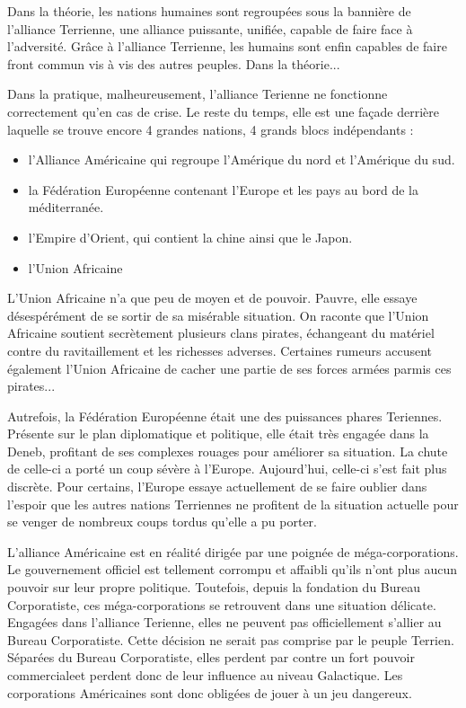 \begin{multicols}{2}
Dans la théorie, les nations humaines sont regroupées sous la bannière de l'alliance Terrienne, une alliance puissante, unifiée, capable de faire face à l'adversité. Grâce à l'alliance Terrienne, les humains sont enfin capables de faire front commun vis à vis des autres peuples. Dans la théorie...

Dans la pratique, malheureusement, l'alliance Terienne ne fonctionne correctement qu'en cas de crise. Le reste du temps, elle est une façade derrière laquelle se trouve encore 4 grandes nations, 4 grands blocs indépendants :
\begin{itemize}
	\item l'Alliance Américaine qui regroupe l'Amérique du nord et l'Amérique du sud.
	\item la Fédération Européenne contenant l'Europe et les pays au bord de la méditerranée. 
	\item l'Empire d'Orient, qui contient la chine ainsi que le Japon.
	\item l'Union Africaine
\end{itemize}

L'Union Africaine n'a que peu de moyen et de pouvoir. Pauvre, elle essaye désespérément de se sortir de sa misérable situation. On raconte que l'Union Africaine soutient secrètement plusieurs clans pirates, échangeant du matériel contre du ravitaillement et les richesses adverses. Certaines rumeurs accusent également l'Union Africaine de cacher une partie de ses forces armées parmis ces pirates... 

Autrefois, la Fédération Européenne était une des puissances phares Teriennes. Présente sur le plan diplomatique et politique, elle était très engagée dans la Deneb, profitant de ses complexes rouages pour améliorer sa situation. La chute de celle-ci a porté un coup sévère à l'Europe. Aujourd'hui, celle-ci s'est fait plus discrète. Pour certains, l'Europe essaye actuellement de se faire oublier dans l'espoir que les autres nations Terriennes ne profitent de la situation actuelle pour se venger de nombreux coups tordus qu'elle a pu porter.

L'alliance Américaine est en réalité dirigée par une poignée de méga-corporations. Le gouvernement officiel est tellement corrompu et affaibli qu'ils n'ont plus aucun pouvoir sur leur propre politique. Toutefois, depuis la fondation du Bureau Corporatiste, ces méga-corporations se retrouvent dans une situation délicate. Engagées dans l'alliance Terienne, elles ne peuvent pas officiellement s'allier au Bureau Corporatiste. Cette décision ne serait pas comprise par le peuple Terrien. Séparées du Bureau Corporatiste, elles perdent par contre un fort pouvoir commercialeet perdent donc de leur influence au niveau Galactique. Les corporations Américaines sont donc obligées de jouer à un jeu dangereux.


\end{multicols}
